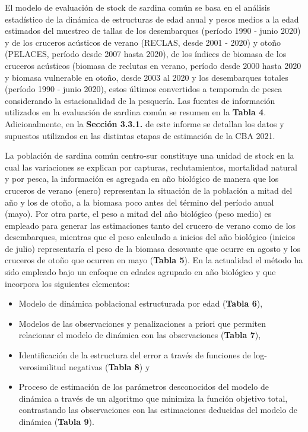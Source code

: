 \documentclass[
  spanish,
]{article}
\providecommand{\tightlist}{%
  \setlength{\itemsep}{0pt}\setlength{\parskip}{0pt}}
\begin{document}
El modelo de evaluación de stock de sardina común se basa en el análisis
estadístico de la dinámica de estructuras de edad anual y pesos medios a
la edad estimados del muestreo de tallas de los desembarques (período
1990 - junio 2020) y de los cruceros acústicos de verano (RECLAS, desde
2001 - 2020) y otoño (PELACES, período desde 2007 hasta 2020), de los
índices de biomasa de los cruceros acústicos (biomasa de reclutas en
verano, período desde 2000 hasta 2020 y biomasa vulnerable en otoño,
desde 2003 al 2020 y los desembarques totales (período 1990 - junio
2020), estos últimos convertidos a temporada de pesca considerando la
estacionalidad de la pesquería. Las fuentes de información utilizados en
la evaluación de sardina común se resumen en la \textbf{Tabla 4}.
Adicionalmente, en la \textbf{Sección 3.3.1.} de este informe se
detallan los datos y supuestos utilizados en las distintas etapas de
estimación de la CBA 2021.

La población de sardina común centro-sur constituye una unidad de stock
en la cual las variaciones se explican por capturas, reclutamientos,
mortalidad natural y por pesca, la información es agregada en año
biológico de manera que los cruceros de verano (enero) representan la
situación de la población a mitad del año y los de otoño, a la biomasa
poco antes del término del período anual (mayo). Por otra parte, el peso
a mitad del año biológico (peso medio) es empleado para generar las
estimaciones tanto del crucero de verano como de los desembarques,
mientras que el peso calculado a inicios del año biológico (inicios de
julio) representaría el peso de la biomasa desovante que ocurre en
agosto y los cruceros de otoño que ocurren en mayo (\textbf{Tabla 5}).
En la actualidad el método ha sido empleado bajo un enfoque en edades
agrupado en año biológico y que incorpora los siguientes elementos:

\begin{itemize}
\tightlist
\item
  Modelo de dinámica poblacional estructurada por edad (\textbf{Tabla
  6}),
\item
  Modelos de las observaciones y penalizaciones a priori que permiten
  relacionar el modelo de dinámica con las observaciones (\textbf{Tabla
  7}),
\item
  Identificación de la estructura del error a través de funciones de
  log-verosimilitud negativas (\textbf{Tabla 8}) y
\item
  Proceso de estimación de los parámetros desconocidos del modelo de
  dinámica a través de un algoritmo que minimiza la función objetivo
  total, contrastando las observaciones con las estimaciones deducidas
  del modelo de dinámica (\textbf{Tabla 9}).
\end{itemize}
\end{document}
